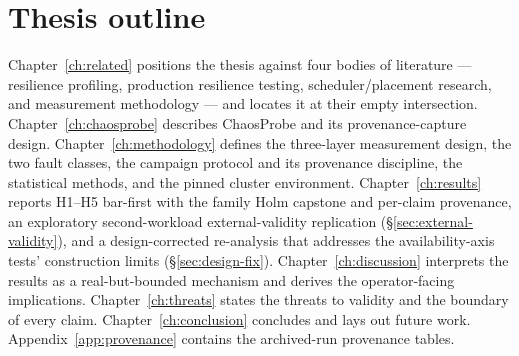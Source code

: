 \section{Thesis outline}\label{sec:outline}

Chapter~\ref{ch:related} positions the thesis against four bodies of literature
--- resilience profiling, production resilience testing, scheduler/placement
research, and measurement methodology --- and locates it at their empty
intersection. Chapter~\ref{ch:chaosprobe} describes ChaosProbe and its
provenance-capture design. Chapter~\ref{ch:methodology} defines the three-layer
measurement design, the two fault classes, the campaign protocol and its
provenance discipline, the statistical methods, and the pinned cluster environment.
Chapter~\ref{ch:results} reports H1--H5 bar-first with the family Holm capstone
and per-claim provenance, an exploratory second-workload external-validity
replication (\S\ref{sec:external-validity}), and a design-corrected re-analysis
that addresses the availability-axis tests' construction limits
(\S\ref{sec:design-fix}). Chapter~\ref{ch:discussion}
interprets the results as a real-but-bounded mechanism and derives the
operator-facing implications. Chapter~\ref{ch:threats} states the threats to
validity and the boundary of every claim. Chapter~\ref{ch:conclusion} concludes
and lays out future work. Appendix~\ref{app:provenance} contains the
archived-run provenance tables.
